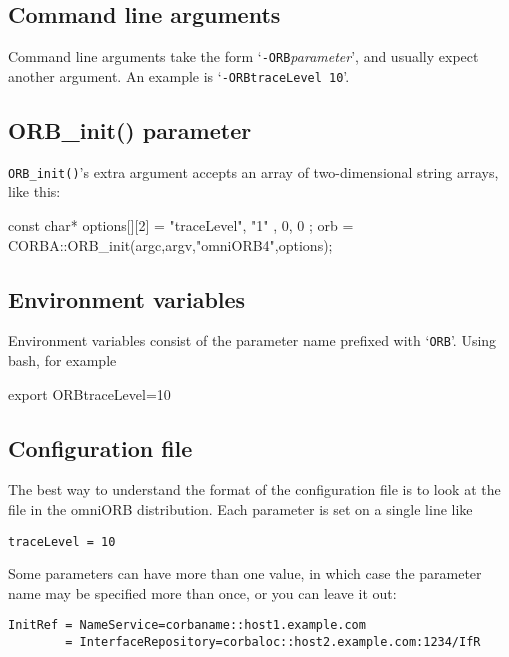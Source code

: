 \documentclass[11pt,oneside,a4paper]{book}
\newcommand{\op}[1]{\texttt{#1()}}
\newcommand{\cmdline}[1]{\texttt{#1}}
\begin{document}
\subsection{Command line arguments}

Command line arguments take the form
`\cmdline{-ORB}\textit{parameter}', and usually expect another
argument. An example is `\cmdline{-ORBtraceLevel 10}'.


\subsection{ORB\_init() parameter}

\op{ORB\_init}'s extra argument accepts an array of two-dimensional
string arrays, like this:

\begin{cxxlisting}
const char* options[][2] = { { "traceLevel", "1" }, { 0, 0 } }; 
orb = CORBA::ORB_init(argc,argv,"omniORB4",options); 
\end{cxxlisting}


\subsection{Environment variables}

Environment variables consist of the parameter name prefixed with
`\cmdline{ORB}'. Using bash, for example

\begin{makelisting}
export ORBtraceLevel=10
\end{makelisting}


\subsection{Configuration file}

The best way to understand the format of the configuration file is to
look at the  file in the omniORB distribution. Each
parameter is set on a single line like

\begin{verbatim}
traceLevel = 10
\end{verbatim}

Some parameters can have more than one value, in which case the
parameter name may be specified more than once, or you can leave it
out:

\begin{verbatim}
InitRef = NameService=corbaname::host1.example.com
        = InterfaceRepository=corbaloc::host2.example.com:1234/IfR
\end{verbatim}
\end{document}
